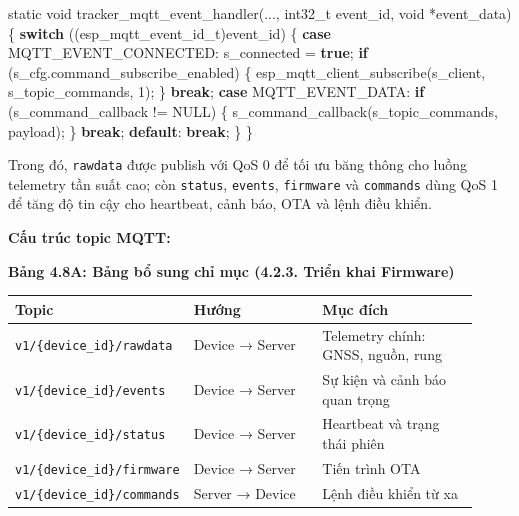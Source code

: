 \documentclass[13pt,a4paper]{extarticle}
\newenvironment{Shaded}{}{}
\newcommand{\ControlFlowTok}[1]{\textcolor[rgb]{0.00,0.44,0.13}{\textbf{#1}}}
\newcommand{\DataTypeTok}[1]{\textcolor[rgb]{0.56,0.13,0.00}{#1}}
\newcommand{\DecValTok}[1]{\textcolor[rgb]{0.25,0.63,0.44}{#1}}
\newcommand{\KeywordTok}[1]{\textcolor[rgb]{0.00,0.44,0.13}{\textbf{#1}}}
\newcommand{\NormalTok}[1]{#1}
\newcommand{\OperatorTok}[1]{\textcolor[rgb]{0.40,0.40,0.40}{#1}}
\newcounter{none} %
\newcommand{\thesislongtableorignewline}{}
\let\thesislongtableorignewline\\
\renewcommand{\\}{\thesislongtableorignewline\hline}%
\let\\\thesislongtableorignewline
\newcommand{\thesistabletitle}[1]{%
  \begin{center}\textbf{#1}\end{center}%
}
\begin{document}
\begin{Shaded}
\begin{Highlighting}[]
\DataTypeTok{static} \DataTypeTok{void}\NormalTok{ tracker\_mqtt\_event\_handler}\OperatorTok{(...,} \DataTypeTok{int32\_t}\NormalTok{ event\_id}\OperatorTok{,} \DataTypeTok{void} \OperatorTok{*}\NormalTok{event\_data}\OperatorTok{)} \OperatorTok{\{}
    \ControlFlowTok{switch} \OperatorTok{((}\NormalTok{esp\_mqtt\_event\_id\_t}\OperatorTok{)}\NormalTok{event\_id}\OperatorTok{)} \OperatorTok{\{}
        \ControlFlowTok{case}\NormalTok{ MQTT\_EVENT\_CONNECTED}\OperatorTok{:}
\NormalTok{            s\_connected }\OperatorTok{=} \KeywordTok{true}\OperatorTok{;}
            \ControlFlowTok{if} \OperatorTok{(}\NormalTok{s\_cfg}\OperatorTok{.}\NormalTok{command\_subscribe\_enabled}\OperatorTok{)} \OperatorTok{\{}
\NormalTok{                esp\_mqtt\_client\_subscribe}\OperatorTok{(}\NormalTok{s\_client}\OperatorTok{,}\NormalTok{ s\_topic\_commands}\OperatorTok{,} \DecValTok{1}\OperatorTok{);}
            \OperatorTok{\}}
            \ControlFlowTok{break}\OperatorTok{;}
        \ControlFlowTok{case}\NormalTok{ MQTT\_EVENT\_DATA}\OperatorTok{:}
            \ControlFlowTok{if} \OperatorTok{(}\NormalTok{s\_command\_callback }\OperatorTok{!=}\NormalTok{ NULL}\OperatorTok{)} \OperatorTok{\{}
\NormalTok{                s\_command\_callback}\OperatorTok{(}\NormalTok{s\_topic\_commands}\OperatorTok{,}\NormalTok{ payload}\OperatorTok{);}
            \OperatorTok{\}}
            \ControlFlowTok{break}\OperatorTok{;}
        \ControlFlowTok{default}\OperatorTok{:}
            \ControlFlowTok{break}\OperatorTok{;}
    \OperatorTok{\}}
\OperatorTok{\}}
\end{Highlighting}
\end{Shaded}

Trong đó, \texttt{rawdata} được publish với QoS 0 để tối ưu băng thông
cho luồng telemetry tần suất cao; còn \texttt{status}, \texttt{events},
\texttt{firmware} và \texttt{commands} dùng QoS 1 để tăng độ tin cậy cho
heartbeat, cảnh báo, OTA và lệnh điều khiển.

\textbf{Cấu trúc topic MQTT:}

{\def\LTcaptype{none} %
\thesistabletitle{Bảng 4.8A: Bảng bổ sung chỉ mục (4.2.3. Triển khai Firmware)}

\begin{longtable}{|p{0.30\linewidth}|p{0.28\linewidth}|p{0.34\linewidth}|}
\hline \textbf{Topic} & \textbf{Hướng} & \textbf{Mục đích} \\
\hline
\endhead
\hline
\endlastfoot
\texttt{v1/\{device\_id\}/rawdata} & Device → Server &
Telemetry chính: GNSS, nguồn, rung \\
\texttt{v1/\{device\_id\}/events} & Device → Server & Sự
kiện và cảnh báo quan trọng \\
\texttt{v1/\{device\_id\}/status} & Device → Server &
Heartbeat và trạng thái phiên \\
\texttt{v1/\{device\_id\}/firmware} & Device → Server &
Tiến trình OTA \\
\texttt{v1/\{device\_id\}/commands} & Server → Device &
Lệnh điều khiển từ xa \\
\end{longtable}
}
\end{document}
